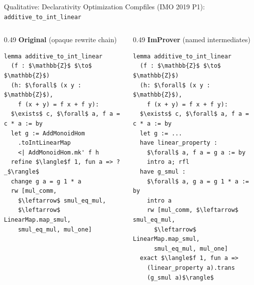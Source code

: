 \begin{frame}[fragile]{Qualitative: Declarativity Optimization}
\vspace{0.3em}
{\small Compfiles (IMO 2019 P1): \texttt{additive\_to\_int\_linear}}
\begin{columns}[T]
\begin{column}{0.49\textwidth}
\textbf{Original} (opaque rewrite chain)
\begin{lstlisting}[basicstyle=\tiny\ttfamily]
lemma additive_to_int_linear
  (f : $\mathbb{Z}$ $\to$ $\mathbb{Z}$)
  (h: $\forall$ (x y : $\mathbb{Z}$),
    f (x + y) = f x + f y):
  $\exists$ c, $\forall$ a, f a = c * a := by
  let g := AddMonoidHom
    .toIntLinearMap
    <| AddMonoidHom.mk' f h
  refine $\langle$f 1, fun a => ?_$\rangle$
  change g a = g 1 * a
  rw [mul_comm,
    $\leftarrow$ smul_eq_mul,
    $\leftarrow$ LinearMap.map_smul,
    smul_eq_mul, mul_one]
\end{lstlisting}
\end{column}
\begin{column}{0.49\textwidth}
\textbf{ImProver} (named intermediates)
\begin{lstlisting}[basicstyle=\tiny\ttfamily]
lemma additive_to_int_linear
  (f : $\mathbb{Z}$ $\to$ $\mathbb{Z}$)
  (h: $\forall$ (x y : $\mathbb{Z}$),
    f (x + y) = f x + f y):
  $\exists$ c, $\forall$ a, f a = c * a := by
  let g := ...
  have linear_property :
    $\forall$ a, f a = g a := by
    intro a; rfl
  have g_smul :
    $\forall$ a, g a = g 1 * a := by
    intro a
    rw [mul_comm, $\leftarrow$ smul_eq_mul,
      $\leftarrow$ LinearMap.map_smul,
      smul_eq_mul, mul_one]
  exact $\langle$f 1, fun a =>
    (linear_property a).trans
    (g_smul a)$\rangle$
\end{lstlisting}
\end{column}
\end{columns}
\end{frame}


